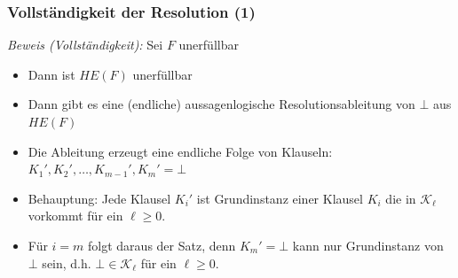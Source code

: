 \documentclass[aspectratio=1610,onlymath]{beamer}
\begin{document}
\begin{frame}[t]\frametitle{Vollständigkeit der Resolution (1)}

\pause

\emph{Beweis (Vollständigkeit):} Sei $F$ unerfüllbar
\begin{itemize}
\item Dann ist $HE(F)$ unerfüllbar
\item Dann gibt es eine (endliche) aussagenlogische Resolutionsableitung von $\bot$ aus $HE(F)$
\item Die Ableitung erzeugt eine endliche Folge von Klauseln: $K_1',K_2',\ldots,K_{m-1}',K_m'=\bot$
\item \alert{Behauptung:} Jede Klausel $K_i'$ ist Grundinstanz einer Klausel $K_i$ die in $\mathcal{K}_\ell$ vorkommt für ein $\ell\geq 0$.
\item Für $i=m$ folgt daraus der Satz, denn $K_m'=\bot$ kann nur Grundinstanz von $\bot$ sein, d.h. $\bot\in\mathcal{K}_\ell$ für ein $\ell\geq 0$.
\end{itemize}

\end{frame}
\end{document}

